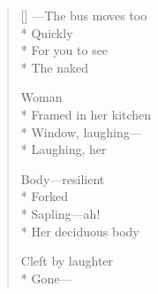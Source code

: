 \label{ch:there}
\settowidth{\versewidth}{               —The bus moves too}
\begin{verse}[\versewidth]
\hspace*{2\vgap} ---The bus moves too\\*
Quickly\\*
For you to see\\*
The naked

Woman\\*
Framed in her kitchen\\*
Window, laughing---\\*
Laughing, her

Body---resilient\\*
Forked\\*
Sapling---ah!\\*
Her deciduous body

Cleft by laughter\\*
Gone---
\end{verse}
